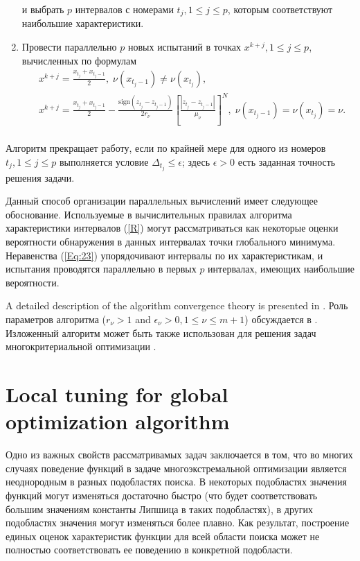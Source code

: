 \documentclass[
11pt,%
tightenlines,%
twoside,%
onecolumn,%
nofloats,%
nobibnotes,%
nofootinbib,%
superscriptaddress,%
noshowpacs,%
centertags]%
{revtex4}
\begin{document}
\begin{enumerate}
\begin{equation}
\end{equation}
и выбрать $p$ интервалов с номерами $t_j, 1\leq j \leq p$, которым соответствуют наибольшие характеристики.
\item
Провести параллельно $p$ новых испытаний в точках $x^{k+j}, 1 \leq j \leq p$, вычисленных по формулам
\begin{eqnarray*}
& x^{k+j}=\frac{x_{t_j}+x_{t_j-1}}{2}, \; \nu(x_{t_j-1})\neq \nu(x_{t_j}), \\
& x^{k+j}=\frac{x_{t_j}+x_{t_j-1}}{2}- \frac{\mathrm{sign}(z_{t_j}-z_{t_j-1})}{2r_\nu}\left[\frac{\left|z_{t_j}-z_{t_j-1}\right|}{\mu_\nu}\right]^N, \; \nu(x_{t_j-1})=\nu(x_{t_j})=\nu. \\
\end{eqnarray*} 

\end{enumerate}

Алгоритм прекращает работу, если по крайней мере для одного из номеров $t_j, 1\leq j \leq p$ выполняется условие $\Delta_{t_j}\leq \epsilon$; здесь $\epsilon>0$ есть заданная точность решения задачи.

Данный способ организации параллельных вычислений имеет следующее обоснование. Используемые в вычислительных правилах алгоритма характеристики интервалов (\ref{R}) могут рассматриваться как некоторые оценки вероятности обнаружения в данных интервалах точки глобального минимума. Неравенства (\ref{Eq:23}) упорядочивают интервалы по их характеристикам, и испытания проводятся параллельно в первых $p$ интервалах, имеющих наибольшие вероятности.

A detailed description of the algorithm convergence theory is presented in \cite{Strongin2000,Strongin2013}.
Роль параметров алгоритма ($r_\nu>1$ and $\epsilon_\nu>0, 1\leq\nu\leq m+1$) обсуждается в \cite{Strongin2020}.
Изложенный алгоритм может быть также использован для решения задач многокритериальной оптимизации \cite{Gergel2020}.

\section{Local tuning for global optimization algorithm}

Одно из важных свойств рассматривамых задач заключается в том, что во многих случаях поведение функций в задаче многоэкстремальной оптимизации является неоднородным в разных подобластях поиска. В некоторых подобластях значения функций могут изменяться достаточно быстро (что будет соответствовать большим значениям константы Липшица в таких подобластях), в других подобластях значения могут изменяться более плавно. Как результат, построение единых оценок характеристик функции для всей области поиска может не полностью соответствовать ее поведению в конкретной подобласти. 
\end{document}

